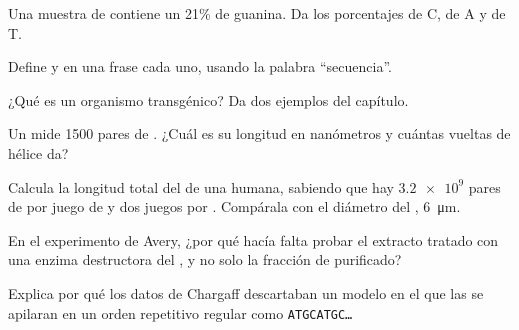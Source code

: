 \begin{exercise}[$\star$]\label{exo:g10:universal-dna:3}
Una muestra de  contiene un 21\% de guanina. Da los porcentajes de
C, de A y de T.
\end{exercise}

\begin{exercise}[$\star$]\label{exo:g10:universal-dna:4}
Define  y  en una frase cada uno, usando la palabra
``secuencia''.
\end{exercise}

\begin{exercise}[$\star$]\label{exo:g10:universal-dna:5}
¿Qué es un organismo transgénico? Da dos ejemplos del capítulo.
\end{exercise}

\begin{exercise}[$\star\star$]\label{exo:g10:universal-dna:6}
Un  mide 1500 pares de . ¿Cuál es su longitud en nanómetros y
cuántas vueltas de hélice da?
\end{exercise}

\begin{exercise}[$\star\star$]\label{exo:g10:universal-dna:7}
Calcula la longitud total del  de una  humana, sabiendo que
hay $\num{3.2e9}$ pares de  por juego de  y dos juegos
por . Compárala con el diámetro del , \qty{6}{\micro m}.
\end{exercise}

\begin{exercise}[$\star\star$]\label{exo:g10:universal-dna:8}
En el experimento de Avery, ¿por qué hacía falta probar el extracto
tratado con una enzima destructora del , y no solo la fracción de
 purificado?
\end{exercise}

\begin{exercise}[$\star\star$]\label{exo:g10:universal-dna:9}
Explica por qué los datos de Chargaff descartaban un modelo en el que
las  se apilaran en un orden repetitivo regular como
\texttt{ATGCATGC\dots}
\end{exercise}

